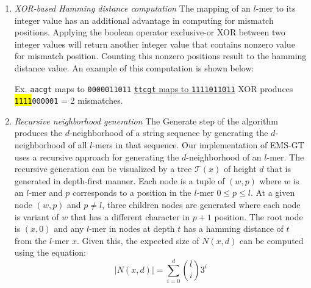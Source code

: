 \begin{enumerate}[label={\em \arabic*.}]
			\bigskip

		\item{\em XOR-based Hamming distance computation}\newline
			The mapping of an $l$-mer to its integer value has an additional advantage in computing for mismatch positions. Applying the boolean operator exclusive-or XOR between two integer values will return another integer value that contains nonzero value for mismatch position. Counting this nonzero positions result to the hamming distance value. An example of this computation is shown below: \newline

			{\small Ex.	\texttt{aacgt} maps to \texttt{0000011011} \newline
				\vspace*{2pt}\hspace*{12pt} \underline{\texttt{ttcgt} maps to \texttt{1111011011}} \newline
				\hspace*{17pt}	XOR produces \texttt{\hl{11}\hl{11}000001} = 2 mismatches.}

			\bigskip

		\item{\em Recursive neighborhood generation}\newline
			The Generate step of the algorithm produces the $d$-neighborhood of a string sequence by generating the $d$-neighborhood of all $l$-mers in that sequence. Our implementation of EMS-GT uses a recursive approach for generating the $d$-neighborhood of an $l$-mer. The recursive generation can be visualized by a tree $\mathcal{T}(x)$ of height $d$ that is generated in depth-first manner. Each node is a tuple of $(w, p)$ where $w$ is an $l$-mer and $p$ corresponds to a position in the $l$-mer $0 \leq p \leq l$. At a given node $(w, p)$ and $p \neq l$, three children nodes are generated where each node is variant of $w$ that has a different character in $p + 1$ position. The root node is $(x, 0)$ and any $l$-mer in nodes at depth $t$ has a hamming distance of $t$ from the $l$-mer $x$. Given this, the expected size of $N(x, d)$ can be computed using the equation: \newline
			\begin{equation}
				|N(x,d)| = \sum_{i=0}^d \binom{l}{i} 3^{i}
			\end{equation}

			\bigskip


\end{enumerate}
